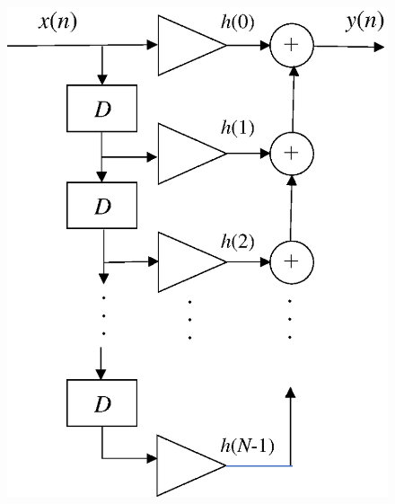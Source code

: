 \begin{figure}[H]
\begin{center}
\begin{minipage}{.4\textwidth}
\begin{center}
\includegraphics[width=.95\textwidth]{fig/zu-2-12.eps}


\end{center}
\end{minipage}
\end{center}
\end{figure}
